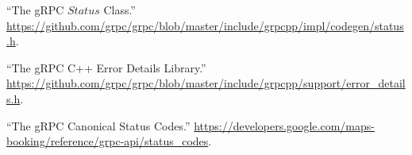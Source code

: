 \documentclass[11pt]{article}
\begin{document}
{{\begin{thebibliography}{38}
\mdbibitemlabel{{}[31]}\textquotedblleft{}The gRPC $Status$ Class.\textquotedblright{} \href{https://github.com/grpc/grpc/blob/master/include/grpcpp/impl/codegen/status.h}{{\ttfamily https://\hspace{0pt}github.\hspace{0pt}com/\hspace{0pt}grpc/\hspace{0pt}grpc/\hspace{0pt}blob/\hspace{0pt}master/\hspace{0pt}include/\hspace{0pt}grpcpp/\hspace{0pt}impl/\hspace{0pt}codegen/\hspace{0pt}status.\hspace{0pt}h}}.\label{grpcstatus}%

\mdbibitemlabel{{}[32]}\textquotedblleft{}The gRPC C++ Error Details Library.\textquotedblright{} \href{https://github.com/grpc/grpc/blob/master/include/grpcpp/support/error_details.h}{{\ttfamily https://\hspace{0pt}github.\hspace{0pt}com/\hspace{0pt}grpc/\hspace{0pt}grpc/\hspace{0pt}blob/\hspace{0pt}master/\hspace{0pt}include/\hspace{0pt}grpcpp/\hspace{0pt}support/\hspace{0pt}error\_\hspace{0pt}details.\hspace{0pt}h}}.\label{grpcerrordetails}%

\mdbibitemlabel{{}[33]}\textquotedblleft{}The gRPC Canonical Status Codes.\textquotedblright{} \href{https://developers.google.com/maps-booking/reference/grpc-api/status_codes}{{\ttfamily https://\hspace{0pt}developers.\hspace{0pt}google.\hspace{0pt}com/\hspace{0pt}maps-\hspace{0pt}booking/\hspace{0pt}reference/\hspace{0pt}grpc-\hspace{0pt}api/\hspace{0pt}status\_\hspace{0pt}codes}}.\label{grpcstatuscodes}%


\end{thebibliography}}}
\end{document}
